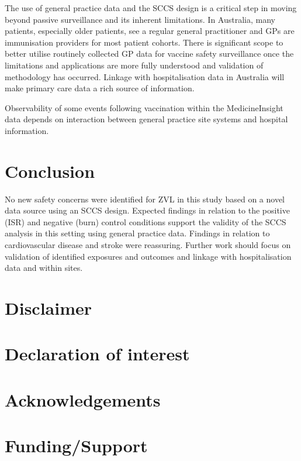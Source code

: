 \documentclass[review, endfloat]{elsarticle}
\begin{document}
The use of general practice data and the SCCS design is a critical step in moving beyond passive surveillance and its inherent limitations. In Australia, many patients, especially older patients, see a regular general practitioner and GPs are immunisation providers for most patient cohorts. There is significant scope to better utilise routinely collected GP data for vaccine safety surveillance once the limitations and applications are more fully understood and validation of methodology has occurred. Linkage with hospitalisation data in Australia will make primary care data a rich source of information.

Observability of some events following vaccination within the MedicineInsight data depends on interaction between general practice site systems and hospital information.

\section{Conclusion}

No new safety concerns were identified for ZVL in this study based on a novel data source using an SCCS design. Expected findings in relation to the positive (ISR) and negative (burn) control conditions support the validity of the SCCS analysis in this setting using general practice data. Findings in relation to cardiovascular disease and stroke were reassuring. Further work should focus on validation of identified exposures and outcomes and linkage with hospitalisation data and within sites.

\section{Disclaimer}

\section{Declaration of interest}

\section{Acknowledgements}

\section{Funding/Support}

\listoftodos[Notes]




\end{document}
